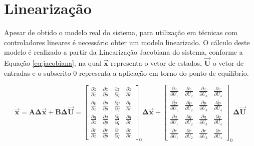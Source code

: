 \documentclass[main.tex]{subfiles}
\begin{document}
\vspace{0.2cm}

\section{Linearização}

Apesar de obtido o modelo real do sistema, para utilização em técnicas com controladores lineares é necessário obter um modelo linearizado. O cálculo deste modelo é realizado a partir da Linearização Jacobiana \cite{jacobiana} do sistema, conforme a Equação \ref{eq:jacobiana}, na qual $\boldsymbol{\vec{x}}$ representa o vetor de estados, $\boldsymbol{\vec{U}}$ o vetor de entradas e o subscrito $0$ representa a aplicação em torno do ponto de equilíbrio.

\vspace{0.1cm}

\begin{equation}\label{eq:jacobiana}
	\boldsymbol{\dot{\vec{x}}} = \boldsymbol{A\Delta \vec{x}} + \boldsymbol{B\Delta \vec{U}} = \begin{bmatrix}
		\frac{\partial \ddot{z}}{\partial z} & \frac{\partial \ddot{z}}{\partial p} & \frac{\partial \ddot{z}}{\partial q} & \frac{\partial \ddot{z}}{\partial r}\\
		
		\frac{\partial \dot{p}}{\partial z} & \frac{\partial \dot{p}}{\partial p} & \frac{\partial \dot{p}}{\partial q} & \frac{\partial \dot{p}}{\partial r}\\
		
		\frac{\partial \dot{q}}{\partial z} & \frac{\partial \dot{q}}{\partial p} & \frac{\partial \dot{q}}{\partial q} & \frac{\partial \dot{q}}{\partial r}\\
		
		\frac{\partial \dot{r}}{\partial z} & \frac{\partial \dot{r}}{\partial p} & \frac{\partial \dot{r}}{\partial q} & \frac{\partial \dot{r}}{\partial r}
	\end{bmatrix}_{0}\boldsymbol{\Delta \vec{x}} + \begin{bmatrix}
		\frac{\partial \ddot{z}}{\partial U_1} & \frac{\partial \ddot{z}}{\partial U_2} & \frac{\partial \ddot{z}}{\partial U_3} & \frac{\partial \ddot{z}}{\partial U_4}\\
		
		\frac{\partial \dot{p}}{\partial U_1} & \frac{\partial \dot{p}}{\partial U_2} & \frac{\partial \dot{p}}{\partial U_3} & \frac{\partial \dot{p}}{\partial U_4}\\
		
		\frac{\partial \dot{q}}{\partial U_1} & \frac{\partial \dot{q}}{\partial U_2} & \frac{\partial \dot{q}}{\partial U_3} & \frac{\partial \dot{q}}{\partial U_4}\\
		
		\frac{\partial \dot{r}}{\partial U_1} & \frac{\partial \dot{r}}{\partial U_2} & \frac{\partial \dot{r}}{\partial U_3} & \frac{\partial \dot{r}}{\partial U_4}
	\end{bmatrix}_{0}\boldsymbol{\Delta \vec{U}}
\end{equation}
\end{document}

